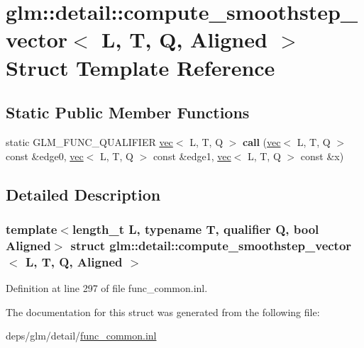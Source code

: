 \hypertarget{structglm_1_1detail_1_1compute__smoothstep__vector}{}\section{glm\+:\+:detail\+:\+:compute\+\_\+smoothstep\+\_\+vector$<$ L, T, Q, Aligned $>$ Struct Template Reference}
\label{structglm_1_1detail_1_1compute__smoothstep__vector}
\subsection*{Static Public Member Functions}
\begin{DoxyCompactItemize}
\item 
\mbox{\label{structglm_1_1detail_1_1compute__smoothstep__vector_ab8a7f72b134cbe4bda4a77fe9cb395d6}} 
static G\+L\+M\+\_\+\+F\+U\+N\+C\+\_\+\+Q\+U\+A\+L\+I\+F\+I\+ER \hyperlink{structglm_1_1vec}{vec}$<$ L, T, Q $>$ {\bfseries call} (\hyperlink{structglm_1_1vec}{vec}$<$ L, T, Q $>$ const \&edge0, \hyperlink{structglm_1_1vec}{vec}$<$ L, T, Q $>$ const \&edge1, \hyperlink{structglm_1_1vec}{vec}$<$ L, T, Q $>$ const \&x)
\end{DoxyCompactItemize}


\subsection{Detailed Description}
\subsubsection*{template$<$length\+\_\+t L, typename T, qualifier Q, bool Aligned$>$\newline
struct glm\+::detail\+::compute\+\_\+smoothstep\+\_\+vector$<$ L, T, Q, Aligned $>$}



Definition at line 297 of file func\+\_\+common.\+inl.



The documentation for this struct was generated from the following file\+:\begin{DoxyCompactItemize}
\item 
deps/glm/detail/\hyperlink{func__common_8inl}{func\+\_\+common.\+inl}\end{DoxyCompactItemize}
